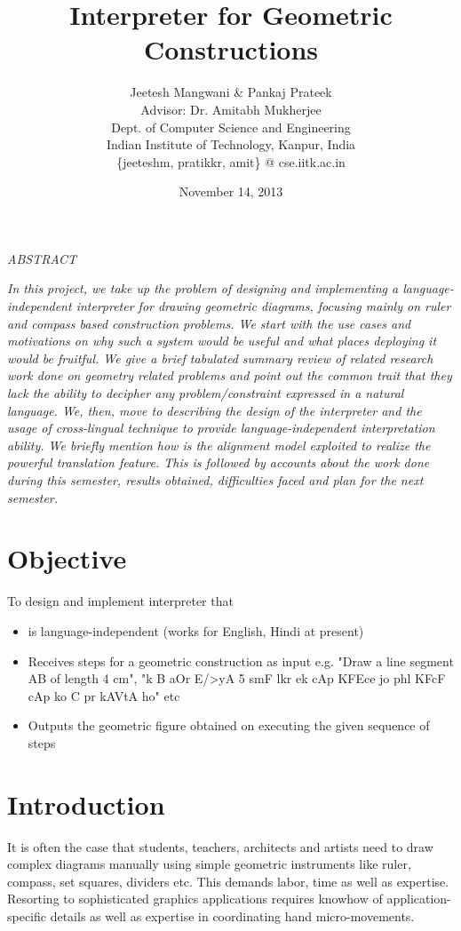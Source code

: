 \def\DevnagVersion{2.15}\documentclass[12pt]{article}
\title{Interpreter for Geometric Constructions}
\author{Jeetesh Mangwani \& Pankaj Prateek\\
	Advisor: Dr. Amitabh Mukherjee\\
        Dept. of Computer Science and Engineering\\
	Indian Institute of Technology, Kanpur, India\\
	\{jeeteshm, pratikkr, amit\} @ cse.iitk.ac.in}
\date{November 14, 2013}
\begin{document}
\maketitle
\begin{center}{\b \em ABSTRACT}\end{center}
{\em In this project, we take up the problem of designing and implementing a language-independent interpreter for drawing geometric diagrams, focusing mainly on ruler and compass based construction problems. We start with the use cases and motivations on why such a system would be useful and what places deploying it would be fruitful. We give a brief tabulated summary review of related research work done on geometry related problems and point out the common trait that they lack the ability to decipher any problem/constraint expressed in a natural language. We, then, move to describing the design of the interpreter and the usage of cross-lingual technique to provide language-independent interpretation ability. We briefly mention how is the alignment model exploited to realize the powerful translation feature. This is followed by accounts about the work done during this semester, results obtained, difficulties faced and plan for the next semester.}

\section{Objective}
To design and implement interpreter that
\begin{itemize}
	\item is language-independent (works for English, Hindi at present)
	\item Receives steps for a geometric construction as input e.g. "Draw a line segment AB of length 4 cm", "{\dn k\?{\qva}} B {\dn aOr E/>yA} 5 {\dn s\?mF l\?kr ek cAp KF{\qva}Ece jo phl\? KF{\qva}cF cAp ko} C {\dn pr kAVtA ho}" etc
	\item Outputs the geometric figure obtained on executing the given sequence of steps 
\end{itemize}

\section{Introduction}
It is often the case that students, teachers, architects and artists need to draw complex diagrams manually using simple geometric instruments like ruler, compass, set squares, dividers etc. This demands labor, time as well as expertise. Resorting to sophisticated graphics applications requires knowhow of application-specific details as well as expertise in coordinating hand micro-movements.\\
\end{document}

